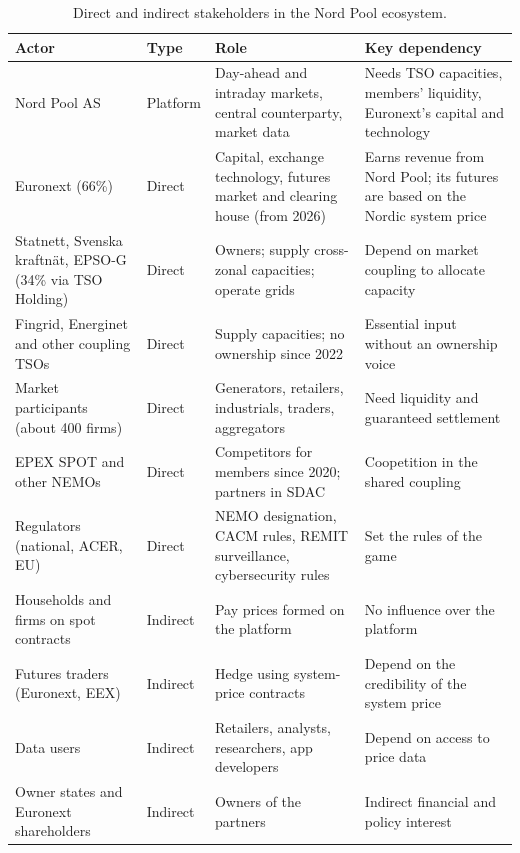 \begin{table}[ht]
\centering
\small
\caption{Direct and indirect stakeholders in the Nord Pool ecosystem.}
\label{tab:stakeholders}
\begin{tabularx}{\textwidth}{L{3.3cm} L{1.4cm} Y Y}
\toprule
\textbf{Actor} & \textbf{Type} & \textbf{Role} & \textbf{Key dependency} \\
\midrule
Nord Pool AS & Platform & Day-ahead and intraday markets, central counterparty, market data & Needs TSO capacities, members' liquidity, Euronext's capital and technology \\
Euronext (66\%) & Direct & Capital, exchange technology, futures market and clearing house (from 2026) & Earns revenue from Nord Pool; its futures are based on the Nordic system price \\
Statnett, Svenska kraftnät, EPSO-G (34\% via TSO Holding) & Direct & Owners; supply cross-zonal capacities; operate grids & Depend on market coupling to allocate capacity \\
Fingrid, Energinet and other coupling TSOs & Direct & Supply capacities; no ownership since 2022 & Essential input without an ownership voice \\
Market participants (about 400 firms) & Direct & Generators, retailers, industrials, traders, aggregators & Need liquidity and guaranteed settlement \\
EPEX SPOT and other NEMOs & Direct & Competitors for members since 2020; partners in SDAC & Coopetition in the shared coupling \\
Regulators (national, ACER, EU) & Direct & NEMO designation, CACM rules, REMIT surveillance, cybersecurity rules & Set the rules of the game \\
Households and firms on spot contracts & Indirect & Pay prices formed on the platform & No influence over the platform \\
Futures traders (Euronext, EEX) & Indirect & Hedge using system-price contracts & Depend on the credibility of the system price \\
Data users & Indirect & Retailers, analysts, researchers, app developers & Depend on access to price data \\
Owner states and Euronext shareholders & Indirect & Owners of the partners & Indirect financial and policy interest \\
\bottomrule
\end{tabularx}
\end{table}

